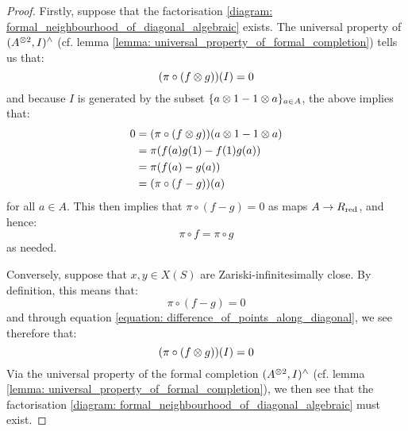 \begin{proof}
                    Firstly, suppose that the factorisation \eqref{diagram: formal_neighbourhood_of_diagonal_algebraic} exists. The universal property of $(A^{\tensor 2}, I)^{\wedge}$ (cf. lemma \ref{lemma: universal_property_of_formal_completion}) tells us that:
                        $$(\pi \circ (f \tensor g))(I) = 0$$
                    and because $I$ is generated by the subset $\{a \tensor 1 - 1 \tensor a\}_{a \in A}$, the above implies that:
                        \begin{equation} \label{equation: difference_of_points_along_diagonal}
                            \begin{aligned}
                                0 & = (\pi \circ (f \tensor g))(a \tensor 1 - 1 \tensor a)
                                \\
                                & = \pi(f(a) g(1) - f(1) g(a))
                                \\
                                & = \pi(f(a) - g(a))
                                \\
                                & = (\pi \circ (f - g))(a)
                            \end{aligned}
                        \end{equation}
                    for all $a \in A$. This then implies that $\pi \circ (f - g) = 0$ as maps $A \to R_{\mathrm{red}}$, and hence:
                        $$\pi \circ f = \pi \circ g$$
                    as needed.

                    Conversely, suppose that $x, y \in X(S)$ are Zariski-infinitesimally close. By definition, this means that:
                        $$\pi \circ (f - g) = 0$$
                    and through equation \eqref{equation: difference_of_points_along_diagonal}, we see therefore that:
                        $$(\pi \circ (f \tensor g))(I) = 0$$
                    Via the universal property of the formal completion $(A^{\tensor 2}, I)^{\wedge}$ (cf. lemma \ref{lemma: universal_property_of_formal_completion}), we then see that the factorisation \eqref{diagram: formal_neighbourhood_of_diagonal_algebraic} must exist.
                \end{proof}

